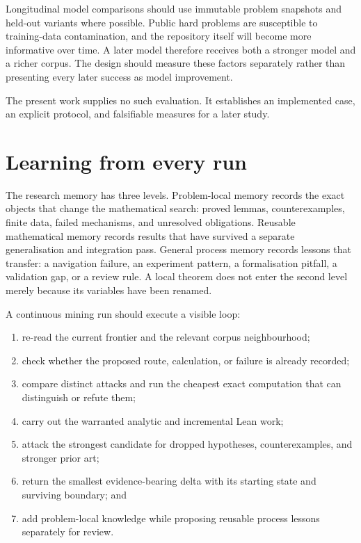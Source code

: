 \documentclass[10pt]{article}
\begin{document}
Longitudinal model comparisons should use immutable problem snapshots and
held-out variants where possible.  Public hard problems are susceptible to
training-data contamination, and the repository itself will become more
informative over time.  A later model therefore receives both a stronger
model and a richer corpus.  The design should measure these factors
separately rather than presenting every later success as model improvement.

The present work supplies no such evaluation.  It establishes an implemented
case, an explicit protocol, and falsifiable measures for a later study.

\section{Learning from every run}\label{sec:learning}

The research memory has three levels.  Problem-local memory records the exact
objects that change the mathematical search: proved lemmas, counterexamples,
finite data, failed mechanisms, and unresolved obligations.  Reusable
mathematical memory records results that have survived a separate
generalisation and integration pass.  General process memory records lessons
that transfer: a navigation failure, an experiment pattern, a formalisation
pitfall, a validation gap, or a review rule.  A local theorem does not enter
the second level merely because its variables have been renamed.

A continuous mining run should execute a visible loop:

\begin{enumerate}
\item re-read the current frontier and the relevant corpus neighbourhood;
\item check whether the proposed route, calculation, or failure is already
      recorded;
\item compare distinct attacks and run the cheapest exact computation that can
      distinguish or refute them;
\item carry out the warranted analytic and incremental Lean work;
\item attack the strongest candidate for dropped hypotheses, counterexamples,
      and stronger prior art;
\item return the smallest evidence-bearing delta with its starting state and
      surviving boundary; and
\item add problem-local knowledge while proposing reusable process lessons
      separately for review.
\end{enumerate}
\end{document}
